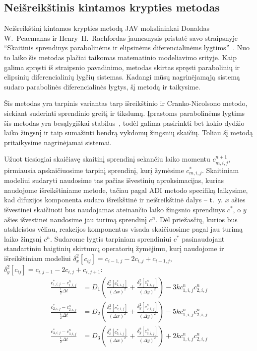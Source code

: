 \newpage
\subsection{Neišreikštinis kintamos krypties metodas}

Neišreikštinį kintamos krypties metodą JAV mokslininkai Donaldas W.~Peacmanas ir Henry~H.~Rachfordas jaunesnysis pristatė savo straipsnyje \enquote{Skaitinis sprendinys parabolinėms ir elipsinėms diferencialinėms lygtims}~\cite{doi:10.1137/0103003}. Nuo to laiko šis metodas plačiai taikomas matematinio modeliavimo srityje. Kaip galima spręsti iš straipsnio pavadinimo, metodas skirtas spręsti parabolinių ir elipsinių diferencialinių lygčių sistemas. Kadangi mūsų nagrinėjamąją sistemą sudaro parabolinės diferencialinės lygtys, šį metodą ir taikysime.

Šis metodas yra tarpinis variantas tarp išreikštinio ir Cranko-Nicolsono metodo, siekiant suderinti sprendinio greitį ir tikslumą. Įprastoms parabolinėms lygtims šis metodas yra besąlygiškai stabilus~\cite{liAlternatingDirectionImplicit2021}, todėl galima pasirinkti bet kokio dydžio laiko žingsnį ir taip sumažinti bendrą vykdomų žingsnių skaičių. Toliau šį metodą pritaikysime nagrinėjamai sistemai.

Užuot tiesiogiai skaičiavę skaitinį sprendinį sekančiu laiko momentu $c^{n+1}_{m,i,j}$, pirmiausia apskaičiuosime tarpinį sprendinį, kurį žymėsime $c^*_{m,i,j}$. Skaitiniam modeliui sudaryti naudosime tas pačias išvestinių aproksimacijas, kurias naudojome išreikštiniame metode, tačiau pagal ADI metodo specifiką laikysime, kad difuzijos komponenta sudaro išreikštinė ir neišreikštinė dalys -- \hbox{t. y.} $x$ ašies išvestinei skaičiuoti bus naudojamas ateinančio laiko žingsnio sprendinys $c^*$, o $y$ ašies išvestinei naudosime jau turimą sprendinį $c^n$. Dėl priežasčių, kurios bus atskleistos vėliau, reakcijos komponentus visada skaičiuosime pagal jau turimą laiko žingsnį $c^n$. Sudarome lygtis tarpiniam sprendiniui $c^*$ pasinaudojant standartiniu baigtinių skirtumų operatorių žymėjimu, kurį naudojome ir išreikštiniam modeliui $\delta_x^2[c_{ij}]=c_{i-1,j}-2c_{i,j}+c_{i+1,j}$, $\delta_y^2[c_{ij}]=c_{i,j-1}-2c_{i,j}+c_{i,j+1}$:
\begin{subequations} \label{eqs:adi-half-step}
\begin{align}
	\frac{c^*_{1,i,j} - c^n_{1,i,j}}{\frac{1}{2}\Delta t} &= D_1 \left( \frac{\delta_x^2[c^*_{1,i,j}]}{(\Delta x)^2} + \frac{\delta_y^2[c^n_{1,i,j}]}{(\Delta y)^2} \right) - 3kc^n_{1,i,j}c^n_{2,i,j}\\
	\frac{c^*_{2,i,j} - c^n_{2,i,j}}{\frac{1}{2}\Delta t} &= D_2 \left( \frac{\delta_x^2[c^*_{2,i,j}]}{(\Delta x)^2} + \frac{\delta_y^2[c^n_{2,i,j}]}{(\Delta y)^2} \right) - 5kc^n_{1,i,j}c^n_{2,i,j}\\
	\frac{c^*_{3,i,j} - c^n_{3,i,j}}{\frac{1}{2}\Delta t} &= D_3 \left( \frac{\delta_x^2[c^*_{3,i,j}]}{(\Delta x)^2} + \frac{\delta_y^2[c^n_{3,i,j}]}{(\Delta y)^2} \right) +2kc^n_{1,i,j}c^n_{2,i,j}
\end{align}
\end{subequations}


